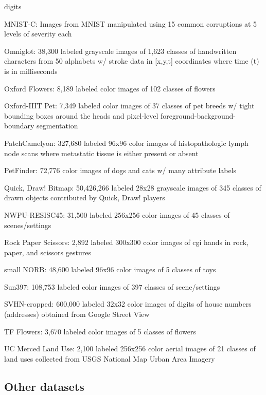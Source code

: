 \documentclass{tufte-handout}
\begin{document}
  digits
\item
 MNIST-C:
  Images from MNIST manipulated using 15 common corruptions at 5 levels
  of severity each
\item
  Omniglot:
  38,300 labeled grayscale images of 1,623 classes of handwritten
  characters from 50 alphabets w/ stroke data in {[}x,y,t{]} coordinates
  where time (t) is in milliseconds
\item
 Oxford
  Flowers: 8,189 labeled color images of 102 classes of flowers
\item
  Oxford-IIIT
  Pet: 7,349 labeled color images of 37 classes of pet breeds w/ tight
  bounding boxes around the heads and pixel-level
  foreground-background-boundary segmentation
\item
  PatchCamelyon:
  327,680 labeled 96x96 color images of histopathologic lymph node scans
  where metastatic tissue is either present or absent
\item
PetFinder:
  72,776 color images of dogs and cats w/ many attribute labels
\item
  Quick,
  Draw! Bitmap: 50,426,266 labeled 28x28 grayscale images of 345
  classes of drawn objects contributed by Quick, Draw! players
\item
NWPU-RESISC45:
  31,500 labeled 256x256 color images of 45 classes of scenes/settings
\item
  Rock
  Paper Scissors: 2,892 labeled 300x300 color images of cgi hands in
  rock, paper, and scissors gestures
\item
small
  NORB: 48,600 labeled 96x96 color images of 5 classes of toys
\item
 Sun397:
  108,753 labeled color images of 397 classes of scene/settings
\item
 SVHN-cropped:
  600,000 labeled 32x32 color images of digits of house numbers
  (addresses) obtained from Google Street View
\item
TF
  Flowers: 3,670 labeled color images of 5 classes of flowers
\item
 UC
  Merced Land Use: 2,100 labeled 256x256 color aerial images of 21
  classes of land uses collected from USGS National Map Urban Area
  Imagery
\ei

\subsection*{Other datasets}\label{other-datasets}
\end{document}
